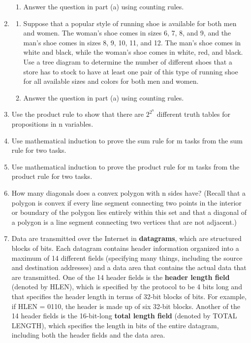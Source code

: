 \documentclass[11pt,a4paper]{book}
\newcommand{\onestaritem}{\refstepcounter{enumi}\item[$*$\theenumi.]}
\begin{document}
\begin{enumerate}
\begin{enumerate}[label=(\alph*)]
\item Answer the question in part (a) using counting rules.
\end{enumerate} 
\item \begin{enumerate}
\item Suppose that a popular style of running shoe is available for both men and women.
The woman's shoe comes in sizes 6, 7, 8, and 9, and the man's shoe comes in sizes 8, 9, 10, 11, and 12.
The man's shoe comes in white and black, while the woman's shoe comes in white, red, and black.
Use a tree diagram to determine the number of different shoes that a store has to stock to have at least one pair of this type of running shoe for all available sizes and colors for both men and women.
\item Answer the question in part (a) using counting rules.
\end{enumerate}
\onestaritem Use the product rule to show that there are $2^{2^{n}}$ different truth tables for propositions in n variables.
\item Use mathematical induction to prove the sum rule for m tasks from the sum rule for two tasks.
\item Use mathematical induction to prove the product rule for m tasks from the product rule for two tasks.
\item How many diagonals does a convex polygon with n sides have? (Recall that a polygon is convex if every line segment connecting two points in the interior or boundary of the polygon lies entirely within this set and that a diagonal of a polygon is a line segment connecting two vertices that are not adjacent.)
\item Data are transmitted over the Internet in \textbf{datagrams}, which are structured blocks of bits.
Each datagram contains header information organized into a maximum of 14 different fields (specifying many things, including the source and destination addresses) and a data area that contains the actual data that are transmitted.
One of the 14 header fields is the \textbf{header length field} (denoted by HLEN), which is specified by the protocol to be 4 bits long and that specifies the header length in terms of 32-bit blocks of bits.
For example, if HLEN = 0110, the header is made up of six 32-bit blocks.
Another of the 14 header fields is the 16-bit-long \textbf{total length field} (denoted by TOTAL LENGTH), which specifies the length in bits of the entire datagram, including both the header fields and the data area.

\end{enumerate}
\end{document}

